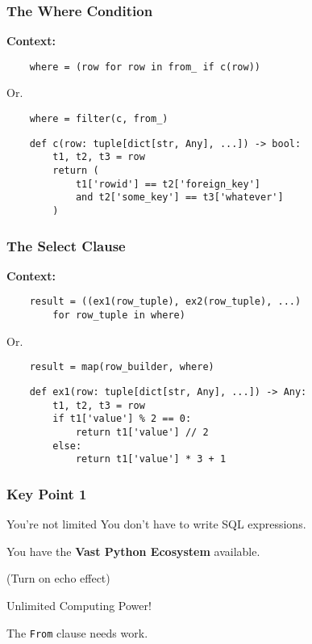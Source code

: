 \documentclass{beamer}
\begin{document}
\begin{frame}[fragile]
    \frametitle{The Where Condition}
    \textbf{Context:}

    \begin{verbatim}
    where = (row for row in from_ if c(row))
    \end{verbatim}

    Or.

    \begin{verbatim}
    where = filter(c, from_)
    \end{verbatim}


    \vspace{1em}
    \begin{verbatim}
    def c(row: tuple[dict[str, Any], ...]) -> bool:
        t1, t2, t3 = row
        return (
            t1['rowid'] == t2['foreign_key']
            and t2['some_key'] == t3['whatever']
        )
    \end{verbatim}


\end{frame}

\begin{frame}[fragile]
    \frametitle{The Select Clause}
    \textbf{Context:}

    \begin{verbatim}
    result = ((ex1(row_tuple), ex2(row_tuple), ...)
        for row_tuple in where)
    \end{verbatim}

    Or.

    \begin{verbatim}
    result = map(row_builder, where)
    \end{verbatim}

    \vspace{1em}
    \begin{verbatim}
    def ex1(row: tuple[dict[str, Any], ...]) -> Any:
        t1, t2, t3 = row
        if t1['value'] % 2 == 0:
            return t1['value'] // 2
        else:
            return t1['value'] * 3 + 1
    \end{verbatim}

\end{frame}

\begin{frame}
    \frametitle{Key Point 1}

    \begin{block}{You're not limited}
        You don't have to write SQL expressions.

        \vspace{1em}
        You have the \textbf{Vast Python Ecosystem} available.
        \pause

        \vspace{1em}
        (Turn on echo effect)

        \Large{Unlimited Computing Power!}
    \end{block}
    \pause

    \vspace{1em}

    The \texttt{From} clause needs work.
\end{frame}
\end{document}
